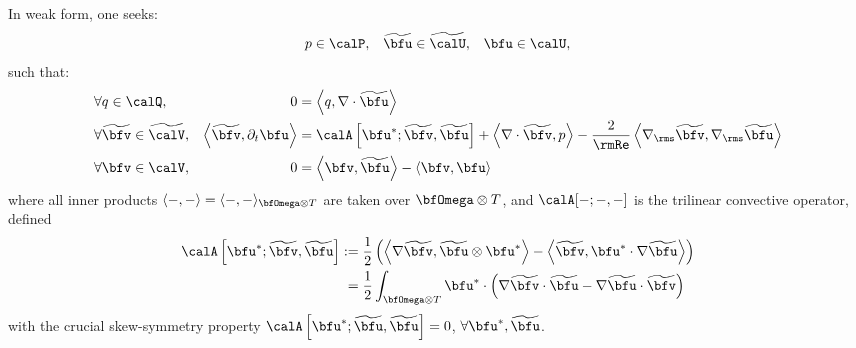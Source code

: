     In weak form, one seeks:
    \begin{align}
                       p  \in  \calP,  &&
        \widetilde{\bfu}  \in  \widetilde{\calU},  &&
                    \bfu  \in  \calU,
    \end{align}
    such that:
    \begin{align}
        &\forall                 q  \in  \calQ,              &                                                            0  &=  \left\langle q, \nabla\cdot\widetilde{\bfu}\right\rangle  \\
        &\forall  \widetilde{\bfv}  \in  \widetilde{\calV},  &  \left\langle\widetilde{\bfv}, \partial_{t}\bfu\right\rangle  &=  \calA\left[\bfu^{*}; \widetilde{\bfv}, \widetilde{\bfu}\right] + \left\langle\nabla\cdot\widetilde{\bfv}, p\right\rangle - \frac{2}{\rmRe}\left\langle\nabla_{\rms}\widetilde{\bfv}, \nabla_{\rms}\widetilde{\bfu}\right\rangle  \\
        &\forall              \bfv  \in  \calV,              &                                                            0  &=  \left\langle\bfv, \widetilde{\bfu}\right\rangle - \left\langle\bfv, \bfu\right\rangle
    \end{align}
    where all inner products $\langle -, -\rangle  =  \langle -, -\rangle_{\bfOmega\otimes T}$ are taken over $\bfOmega\otimes T$, and $\calA[-; -, -]$ is the trilinear convective operator, defined
    \begin{align}
        \calA\left[\bfu^{*}; \widetilde{\bfv}, \widetilde{\bfu}\right]  :=  &\;\frac{1}{2}\left(\left\langle\nabla\widetilde{\bfv}, \widetilde{\bfu}\otimes\bfu^{*}\right\rangle - \left\langle\widetilde{\bfv}, \bfu^{*}\cdot\nabla\widetilde{\bfu}\right\rangle\right)  \label{eqn:convective operator definition}  \\
        =  &\;\frac{1}{2}\int_{\bfOmega\otimes T}\bfu^{*}\cdot\left(\nabla\widetilde{\bfv}\cdot\widetilde{\bfu} - \nabla\widetilde{\bfu}\cdot\widetilde{\bfv}\right)
    \end{align}
    with the crucial skew-symmetry property $\calA\left[\bfu^{*}; \widetilde{\bfu}, \widetilde{\bfu}\right] 
     =  0$, $\forall \bfu^{*}, \widetilde{\bfu}$.

    \begin{remark}
    \end{remark}

